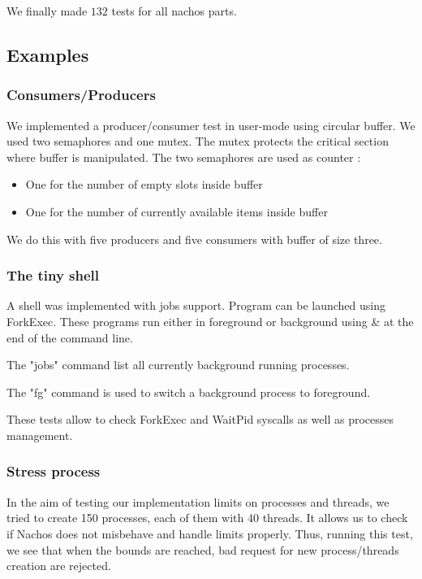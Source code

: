 We finally made $132$ tests for all nachos parts. 

\subsection{Examples}
\subsubsection{Consumers/Producers}
We implemented a producer/consumer test in user-mode using circular buffer.
We used two semaphores and one mutex. The mutex protects the critical section
where buffer is manipulated. The two semaphores are used as counter :
\begin{itemize}
    \item One for the number of empty slots inside buffer
    \item One for the number of currently available items inside buffer
\end{itemize}

We do this with five producers and five consumers with buffer of size three.

\subsubsection{The tiny shell}
A shell was implemented with jobs support. Program can be launched using
ForkExec.
These programs run either in foreground or background using \& at
the end of the command line.

The "jobs" command list all currently background running processes.

The "fg" command is used to switch a background process to foreground.

These tests allow to check ForkExec and WaitPid syscalls as well as processes
management.

\subsubsection{Stress process}
In the aim of testing our implementation limits on processes and threads, we
tried to create 150 processes, each of them with 40 threads.
It allows us to check if Nachos does not misbehave and handle limits properly.
Thus, running this test, we see that when the bounds are reached, bad request for
new process/threads creation are rejected.

